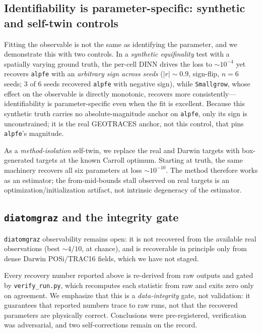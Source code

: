 \documentclass[11pt]{article}
\begin{document}
\subsection{Identifiability is parameter-specific: synthetic and self-twin controls}

Fitting the observable is not the same as identifying the parameter, and we demonstrate this with two controls. In a \emph{synthetic equifinality} test with a spatially varying ground truth, the per-cell DINN drives the loss to $\sim10^{-4}$ yet recovers \texttt{alpfe} with an \emph{arbitrary sign across seeds} ($|r|\sim0.9$, sign-flip, $n=6$ seeds; $3$ of $6$ seeds recovered \texttt{alpfe} with negative sign), while \texttt{Smallgrow}, whose effect on the observable is directly monotonic, recovers more consistently---identifiability is parameter-specific even when the fit is excellent. Because this synthetic truth carries no absolute-magnitude anchor on \texttt{alpfe}, only its sign is unconstrained; it is the real GEOTRACES anchor, not this control, that pins \texttt{alpfe}'s magnitude.

As a \emph{method-isolation} self-twin, we replace the real and Darwin targets with box-generated targets at the known Carroll optimum. Starting at truth, the same machinery recovers all six parameters at loss $\sim10^{-10}$. The method therefore works as an estimator; the from-mid-bounds stall observed on real targets is an optimization/initialization artifact, not intrinsic degeneracy of the estimator.

\subsection{\texttt{diatomgraz} and the integrity gate}

\texttt{diatomgraz} observability remains open: it is not recovered from the available real observations (best $\sim4/10$, at chance), and is recoverable in principle only from dense Darwin POSi/TRAC16 fields, which we have not staged.

Every recovery number reported above is re-derived from raw outputs and gated by \texttt{verify\_run.py}, which recomputes each statistic from raw and exits zero only on agreement. We emphasize that this is a \emph{data-integrity} gate, not validation: it guarantees that reported numbers trace to raw runs, not that the recovered parameters are physically correct. Conclusions were pre-registered, verification was adversarial, and two self-corrections remain on the record.
\end{document}
